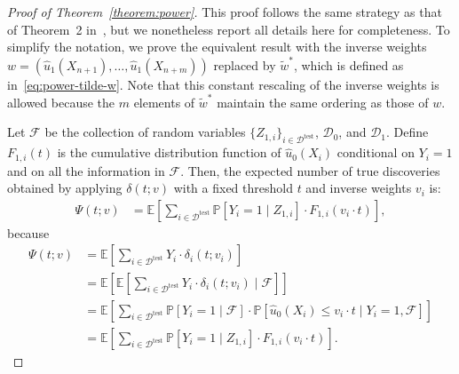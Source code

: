 \documentclass[11pt]{article}
\renewcommand{\P}[1]{\mathbb{P}\left[#1\right]}
\newcommand{\E}[1]{\mathbb{E}\left[#1\right]}
\begin{document}
\begin{proof}[Proof of Theorem~\ref{theorem:power}]
This proof follows the same strategy as that of Theorem~2 in~\cite{liang2022locally}, but we nonetheless report all details here for completeness.
To simplify the notation, we prove the equivalent result with the inverse weights $w = (\hat{u}_1(X_{n+1}), \ldots, \hat{u}_1(X_{n+m}))$ replaced by $\tilde{w}^*$, which is defined as in~\eqref{eq:power-tilde-w}.
Note that this constant rescaling of the inverse weights is allowed because the $m$ elements of $\tilde{w}^*$ maintain the same ordering as those of $w$.

Let $\mathcal{F}$ be the collection of random variables $\{Z_{1,i}\}_{i\in \mathcal{D}^{\mathrm{test}}}$, $\mathcal{D}_0$, and $\mathcal{D}_1$.
Define $F_{1,i}(t)$ is the cumulative distribution function of $\hat{u}_0(X_i)$ conditional on $Y_i=1$ and on all the information in $\mathcal{F}$.
Then, the expected number of true discoveries obtained by applying $\delta(t; v)$ with a fixed threshold $t$ and inverse weights $v_i$ is:
\begin{align} \label{eq:psi-expectation}
  \Psi(t;v)
  &= \E{ \sum_{i \in \mathcal{D}^{\mathrm{test}}} \P{Y_i=1 \mid Z_{1,i}} \cdot F_{1,i}(v_i \cdot t) },
\end{align}
because
\begin{align*}
  \Psi(t;v)
  &= \E{\sum_{i \in \mathcal{D}^{\mathrm{test}}} Y_i \cdot \delta_i(t; v_i) }\\
  &= \E{ \E{ \sum_{i \in \mathcal{D}^{\mathrm{test}}} Y_i \cdot \delta_i(t; v_i) \mid \mathcal{F} }}\\
  &= \E{ \sum_{i \in \mathcal{D}^{\mathrm{test}}} \P{Y_i=1 \mid \mathcal{F}} \cdot \P{\hat{u}_0(X_i) \leq v_i \cdot t \mid Y_i=1, \mathcal{F} } }\\
  &= \E{ \sum_{i \in \mathcal{D}^{\mathrm{test}}} \P{Y_i=1 \mid Z_{1,i}} \cdot F_{1,i}(v_i \cdot t) }.
\end{align*}


\end{proof}
\end{document}
